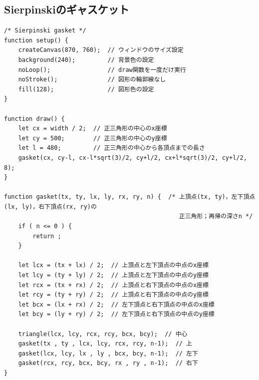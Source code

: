 \documentclass[dvipdfmx]{jsarticle}
\theoremstyle{definition}
\begin{document}
\subsection{Sierpinskiのギャスケット}  \label{subsec_code_gasket}
\begin{lstlisting}[caption=Sierpinskiのギャスケット, label=code_gasket_all]
/* Sierpinski gasket */
function setup() {
    createCanvas(870, 760);  // ウィンドウのサイズ設定
    background(240);         // 背景色の設定
    noLoop();                // draw関数を一度だけ実行
    noStroke();              // 図形の輪郭線なし
    fill(128);               // 図形色の設定
}

function draw() {
    let cx = width / 2;  // 正三角形の中心のx座標
    let cy = 500;        // 正三角形の中心のy座標
    let l = 480;         // 正三角形の中心から各頂点までの長さ
    gasket(cx, cy-l, cx-l*sqrt(3)/2, cy+l/2, cx+l*sqrt(3)/2, cy+l/2, 8);
}

function gasket(tx, ty, lx, ly, rx, ry, n) {  /* 上頂点(tx, ty)，左下頂点(lx, ly)，右下頂点(rx, ry)の
                                                 正三角形；再帰の深さn */
    if ( n <= 0 ) {
        return ;
    }

    let lcx = (tx + lx) / 2;  // 上頂点と左下頂点の中点のx座標
    let lcy = (ty + ly) / 2;  // 上頂点と左下頂点の中点のy座標
    let rcx = (tx + rx) / 2;  // 上頂点と右下頂点の中点のx座標
    let rcy = (ty + ry) / 2;  // 上頂点と右下頂点の中点のy座標
    let bcx = (lx + rx) / 2;  // 左下頂点と右下頂点の中点のx座標
    let bcy = (ly + ry) / 2;  // 左下頂点と右下頂点の中点のy座標

    triangle(lcx, lcy, rcx, rcy, bcx, bcy);  // 中心
    gasket(tx , ty , lcx, lcy, rcx, rcy, n-1);  // 上
    gasket(lcx, lcy, lx , ly , bcx, bcy, n-1);  // 左下
    gasket(rcx, rcy, bcx, bcy, rx , ry , n-1);  // 右下
}
\end{lstlisting}
\clearpage

\end{document}
